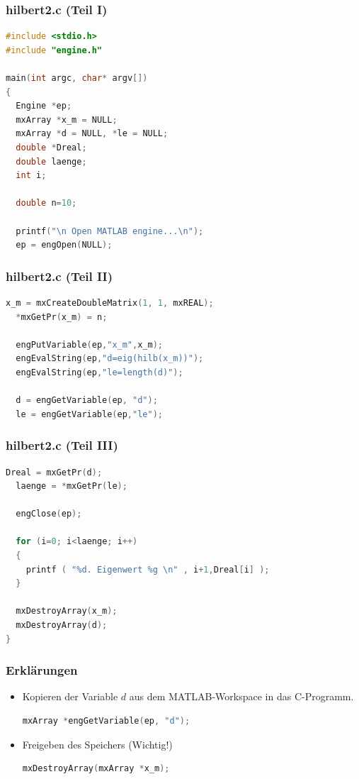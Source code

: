 \documentclass[hyperref={xetex}]{beamer}
\begin{document}
%
%
\begin{frame}[fragile]\frametitle{hilbert2.c (Teil I)}
\begin{lstlisting}[language=C++]
#include <stdio.h>
#include "engine.h"
 
main(int argc, char* argv[])
{
  Engine *ep;
  mxArray *x_m = NULL;
  mxArray *d = NULL, *le = NULL;
  double *Dreal;
  double laenge;
  int i;
     
  double n=10;
      
  printf("\n Open MATLAB engine...\n");
  ep = engOpen(NULL);
\end{lstlisting}
\end{frame}
%
%
\begin{frame}[fragile]\frametitle{hilbert2.c (Teil II)}
\begin{lstlisting}[language=C++]
  x_m = mxCreateDoubleMatrix(1, 1, mxREAL);
  *mxGetPr(x_m) = n;
     
  engPutVariable(ep,"x_m",x_m);
  engEvalString(ep,"d=eig(hilb(x_m))");
  engEvalString(ep,"le=length(d)");
     
  d = engGetVariable(ep, "d");
  le = engGetVariable(ep,"le");
\end{lstlisting}
\end{frame}
%
%
\begin{frame}[fragile]\frametitle{hilbert2.c (Teil III)}
\begin{lstlisting}[language=C++]     
  Dreal = mxGetPr(d);
  laenge = *mxGetPr(le);
    
  engClose(ep);
     
  for (i=0; i<laenge; i++)
  {
    printf ( "%d. Eigenwert %g \n" , i+1,Dreal[i] );
  }
     
  mxDestroyArray(x_m);
  mxDestroyArray(d);
}    
\end{lstlisting}
\end{frame}
%
% 
\begin{frame}[fragile]\frametitle{Erkl\"arungen}
\begin{itemize}
\item Kopieren der Variable $d$ aus dem MATLAB-Workspace in das C-Programm.
\begin{lstlisting}[language=C++]
mxArray *engGetVariable(ep, "d");
\end{lstlisting}
\item Freigeben des Speichers (Wichtig!)
\begin{lstlisting}[language=C++]
mxDestroyArray(mxArray *x_m);
\end{lstlisting}
\end{itemize}
\end{frame}
\end{document}
